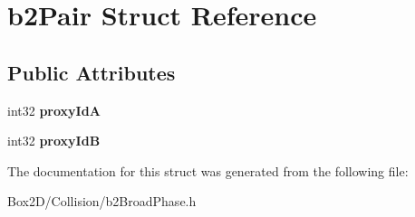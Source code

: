 \hypertarget{structb2_pair}{}\section{b2\+Pair Struct Reference}
\label{structb2_pair}
\subsection*{Public Attributes}
\begin{DoxyCompactItemize}
\item 
\mbox{\label{structb2_pair_abae3df5e877cf0c4611334e3eec4b84c}} 
int32 {\bfseries proxy\+IdA}
\item 
\mbox{\label{structb2_pair_af2bd888ccb34535ab9126497349da749}} 
int32 {\bfseries proxy\+IdB}
\end{DoxyCompactItemize}


The documentation for this struct was generated from the following file\+:\begin{DoxyCompactItemize}
\item 
Box2\+D/\+Collision/b2\+Broad\+Phase.\+h\end{DoxyCompactItemize}
